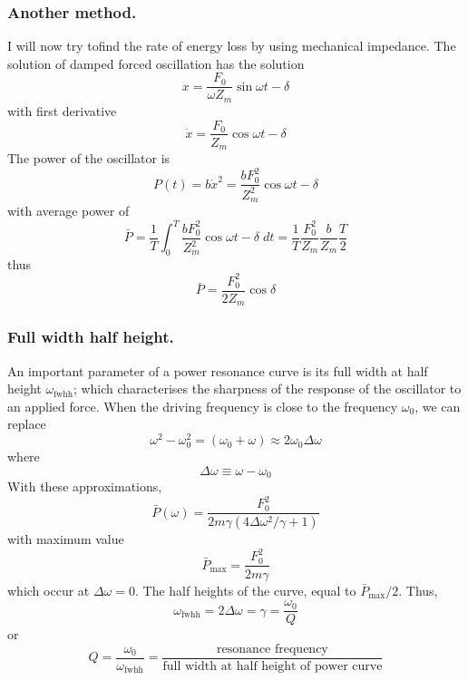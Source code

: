 \documentclass[../../../main.tex]{subfiles}
\begin{document}
\subsubsection*{Another method.} I will now try tofind the rate of energy loss by using mechanical impedance. The solution of damped forced oscillation has the solution
\begin{equation*}
    x=\frac{F_0 }{\omega Z_m}\sin \omega t-\delta
\end{equation*}
with first derivative
\begin{equation*}
    \dot{x}=\frac{F_0}{Z_m}\cos  \omega t-\delta
\end{equation*}
The power of the oscillator is
\begin{equation*}
    P(t)=b\dot{x}^2=\frac{b F_0^2}{Z_m^2}\cos  \omega t-\delta
\end{equation*}
with average power of
\begin{equation*}
    \bar{P}=\frac{1}{T}\int_{0}^{T} \frac{b F_0^2}{Z_m^2}\cos  \omega t-\delta \; dt=\frac{1}{T}\frac{F_0^2}{Z_m} \frac{b}{Z_m} \frac{T}{2}
\end{equation*}
thus
\begin{equation*}
    \bar{P}=\frac{F_0^2}{2Z_m}\cos \delta
\end{equation*}


\subsubsection*{Full width half height.} An important parameter of a power resonance curve is its full width at half height $\omega_\text{fwhh}$; which characterises the sharpness of the response of the oscillator to an applied force. When the driving frequency is close to the frequency $\omega_0$, we can replace
\begin{equation*}
    \omega^2-\omega_0^2=(\omega_0+\omega)\approx 2\omega_0 \Delta \omega
\end{equation*}
where
\begin{equation*}
    \Delta \omega \equiv \omega -\omega_0
\end{equation*}
With these approximations, 
\begin{equation*}
    \bar{P} (\omega)=\frac{F_0^2}{2m\gamma(4\Delta\omega^2/\gamma+1)}
\end{equation*}
with maximum value
\begin{equation*}
    \bar{P}_{\text{max}}=\frac{F_0^2}{2m\gamma}
\end{equation*}
which occur at $\Delta\omega=0$. The half heights of the curve, equal to $\bar{P}_{\text{max}}/2$. Thus,
\begin{equation*}
    \omega_\text{fwhh}=2\Delta\omega=\gamma=\frac{\omega_0}{Q}
\end{equation*}
or 
\begin{equation*}
    Q=\frac{\omega_0}{\omega_\text{fwhh}}=\frac{\text{resonance frequency}}{\text{full width at half height of power curve}}
\end{equation*}
\end{document}
